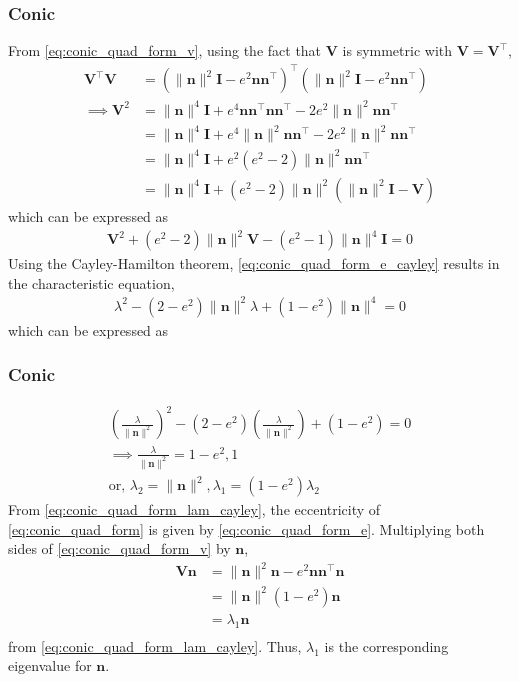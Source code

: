 \documentclass{beamer}
\providecommand{\brak}[1]{\ensuremath{\left(#1\right)}}
\theoremstyle{remark}
\providecommand{\norm}[1]{\lVert#1\rVert}
\let\vec\mathbf
\begin{document}
\begin{frame}
\frametitle{Conic}
	From \eqref{eq:conic_quad_form_v}, using the fact that $\vec{V}$ is symmetric with $\vec{V} = \vec{V}^{\top}$,
  \begin{align}
	  \vec{V}^{\top} \vec{V}&=\brak{\norm{\vec{n}}^2\vec{I}-e^2\vec{n}\vec{n}^{\top}}^{\top}
	  \brak{\norm{\vec{n}}^2\vec{I}-e^2\vec{n}\vec{n}^{\top}}
    \\
	  \implies \vec{V}^{2} &= \norm{\vec{n}}^4\vec{I}+e^4\vec{n}\vec{n}^{\top}\vec{n}\vec{n}^{\top}
	  -2e^2\norm{\vec{n}}^2\vec{n}\vec{n}^{\top}
    \\
	  &= \norm{\vec{n}}^4\vec{I} + e^4\norm{\vec{n}}^2\vec{n}\vec{n}^{\top}
	  - 2e^2\norm{\vec{n}}^2\vec{n}\vec{n}^{\top}
    \\
	  &= \norm{\vec{n}}^4\vec{I} + e^2\brak{e^2 - 2}\norm{\vec{n}}^2\vec{n}\vec{n}^{\top}
    \\
	  &= \norm{\vec{n}}^4\vec{I} + \brak{e^2 - 2}\norm{\vec{n}}^2\brak{\norm{\vec{n}}^2\vec{I}- \vec{V}}
    \end{align}
%    
which can be expressed as
\begin{align}
  \vec{V}^{2} + \brak{e^2 - 2}\norm{\vec{n}}^2\vec{V} - \brak{e^2 - 1}\norm{\vec{n}}^4\vec{I}=0
  \label{eq:conic_quad_form_e_cayley}
\end{align}
	Using the Cayley-Hamilton theorem,
	\eqref{eq:conic_quad_form_e_cayley} results in the characteristic equation, 
\begin{align}
  \lambda^{2} - \brak{2-e^2}\norm{\vec{n}}^2\lambda + \brak{1-e^2 }\norm{\vec{n}}^4=0
\end{align}
which can be expressed as
\end{frame}
\begin{frame}
\frametitle{Conic}
\begin{align}
\brak{\frac{\lambda}{\norm{\vec{n}}^2}}^2 - \brak{2-e^2 }\brak{\frac{\lambda}{\norm{\vec{n}}^2}} 
	+ \brak{1-e^2 } = 0
	\\
	\implies \frac{\lambda}{\norm{\vec{n}}^2} = 1-e^2, 1
  \\
	\text{or, }\lambda_2 = \norm{\vec{n}}^2, \lambda_1 = \brak{1-e^2}\lambda_2 
  \label{eq:conic_quad_form_lam_cayley}
\end{align}
From   \eqref{eq:conic_quad_form_lam_cayley}, the eccentricity of \eqref{eq:conic_quad_form} is given by 
\eqref{eq:conic_quad_form_e}.   
%
Multiplying both sides of    \eqref{eq:conic_quad_form_v} by $\vec{n}$,
\begin{align}
\vec{V} \vec{n}&=\norm{\vec{n}}^2\vec{n}-e^2\vec{n}\vec{n}^{\top}\vec{n} 
\\
&=\norm{\vec{n}}^2\brak{1-e^2}\vec{n} 
 \\
  &=\lambda_1 \vec{n} 
	\\
  \label{eq:eigevecn}
\end{align}  
from \eqref{eq:conic_quad_form_lam_cayley}.
Thus,  $\lambda_1$ is the corresponding eigenvalue for $\vec{n}$. 
\end{frame}
\end{document}
